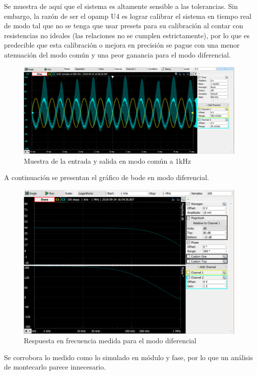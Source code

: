 \documentclass[../../tc_tp3_main.tex]{subfiles}
\begin{document}
	Se muestra de aquí que el sistema es altamente sensible a las tolerancias. Sin embargo, la razón de ser el opamp U4 es lograr calibrar el sistema en tiempo real de modo tal que no se tenga que usar presets para su calibración al contar con resistencias no ideales (las relaciones no se cumplen estrictamente), por lo que es predecible que esta calibración o mejora en precisión se pague con una menor atenuación del modo común y una peor ganancia para el modo diferencial.
			\begin{figure}[h!]	
		\centering
		\includegraphics[scale=0.6]{imagenes/ganancia_comun_medido.png}
		\caption{Muestra de la entrada y salida en modo común a 1kHz}
		\label{fig:ej3_ganancia_comun_medido}
	\end{figure}
	
	A continuación se presentan el gráfico de bode en modo diferencial.
	
	\begin{figure}[h!]	
		\centering
		\includegraphics[scale=0.6]{imagenes/bode_diferencial_medido.png}
		\caption{Respuesta en frecuencia medida para el modo diferencial}
		\label{fig:ej3_bode_diferencial_medido}
	\end{figure}
	Se corrobora lo medido como lo simulado en módulo y fase, por lo que un análisis de montecarlo parece innecesario.
	
\end{document}
